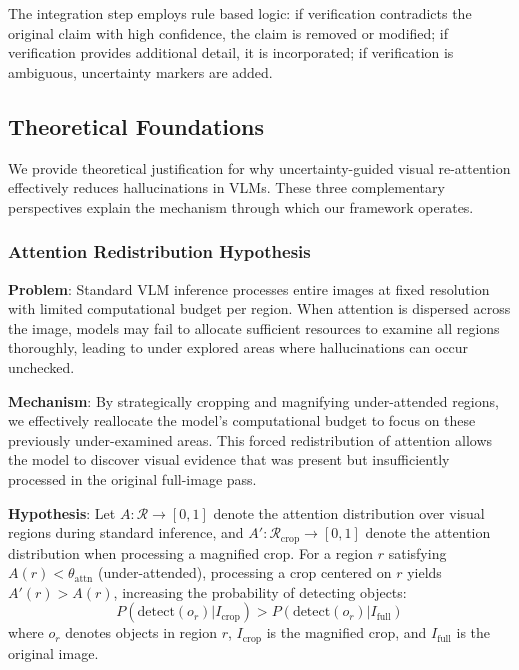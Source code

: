\documentclass[12pt]{article}
\begin{document}
The integration step employs rule based logic: if verification contradicts the original claim with high confidence, the claim is removed or modified; if verification provides additional detail, it is incorporated; if verification is ambiguous, uncertainty markers are added.

\subsection{Theoretical Foundations}

We provide theoretical justification for why uncertainty-guided visual re-attention effectively reduces hallucinations in VLMs. These three complementary perspectives explain the mechanism through which our framework operates.

\subsubsection{Attention Redistribution Hypothesis}

\textbf{Problem}: Standard VLM inference processes entire images at fixed resolution with limited computational budget per region. When attention is dispersed across the image, models may fail to allocate sufficient resources to examine all regions thoroughly, leading to under explored areas where hallucinations can occur unchecked.

\vspace{1em}

\textbf{Mechanism}: By strategically cropping and magnifying under-attended regions, we effectively reallocate the model's computational budget to focus on these previously under-examined areas. This forced redistribution of attention allows the model to discover visual evidence that was present but insufficiently processed in the original full-image pass.

\vspace{1em}

\textbf{Hypothesis}: Let \(A: \mathcal{R} \to [0,1]\) denote the attention distribution over visual regions during standard inference, and \(A': \mathcal{R}_{\text{crop}} \to [0,1]\) denote the attention distribution when processing a magnified crop. For a region \(r\) satisfying \(A(r) < \theta_{\text{attn}}\) (under-attended), processing a crop centered on \(r\) yields \(A'(r) > A(r)\), increasing the probability of detecting objects: 
\[P(\text{detect}(o_r) | I_{\text{crop}}) > P(\text{detect}(o_r) | I_{\text{full}})\]
where \(o_r\) denotes objects in region \(r\), \(I_{\text{crop}}\) is the magnified crop, and \(I_{\text{full}}\) is the original image.
\end{document}
